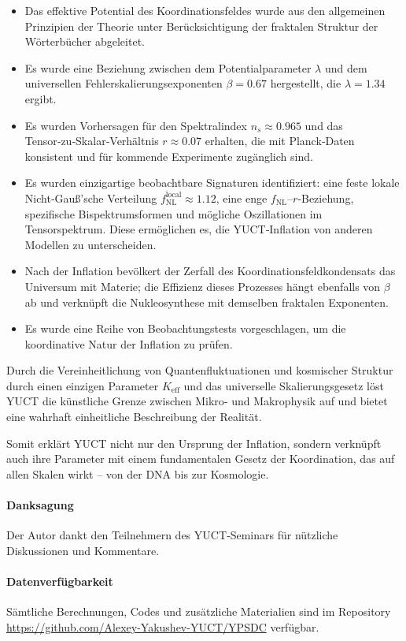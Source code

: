 \documentclass[12pt]{article}
\theoremstyle{remark}
\begin{document}
	\begin{itemize}
		\item Das effektive Potential des Koordinationsfeldes wurde aus den allgemeinen Prinzipien der Theorie unter Berücksichtigung der fraktalen Struktur der Wörterbücher abgeleitet.
		\item Es wurde eine Beziehung zwischen dem Potentialparameter $\lambda$ und dem universellen Fehlerskalierungsexponenten $\beta = 0.67$ hergestellt, die $\lambda = 1.34$ ergibt.
		\item Es wurden Vorhersagen für den Spektralindex $n_s \approx 0.965$ und das Tensor‑zu‑Skalar‑Verhältnis $r \approx 0.07$ erhalten, die mit Planck‑Daten konsistent und für kommende Experimente zugänglich sind.
		\item Es wurden einzigartige beobachtbare Signaturen identifiziert: eine feste lokale Nicht‑Gauß’sche Verteilung $f_{\text{NL}}^{\text{local}} \approx 1.12$, eine enge $f_{\text{NL}}$–$r$‑Beziehung, spezifische Bispektrumsformen und mögliche Oszillationen im Tensorspektrum. Diese ermöglichen es, die YUCT‑Inflation von anderen Modellen zu unterscheiden.
		\item Nach der Inflation bevölkert der Zerfall des Koordinationsfeldkondensats das Universum mit Materie; die Effizienz dieses Prozesses hängt ebenfalls von $\beta$ ab und verknüpft die Nukleosynthese mit demselben fraktalen Exponenten.
		\item Es wurde eine Reihe von Beobachtungstests vorgeschlagen, um die koordinative Natur der Inflation zu prüfen.
	\end{itemize}
	
	Durch die Vereinheitlichung von Quantenfluktuationen und kosmischer Struktur durch einen einzigen Parameter $K_{\mathrm{eff}}$ und das universelle Skalierungsgesetz löst YUCT die künstliche Grenze zwischen Mikro‑ und Makrophysik auf und bietet eine wahrhaft einheitliche Beschreibung der Realität.
	
	Somit erklärt YUCT nicht nur den Ursprung der Inflation, sondern verknüpft auch ihre Parameter mit einem fundamentalen Gesetz der Koordination, das auf allen Skalen wirkt – von der DNA bis zur Kosmologie.
	
	\paragraph*{Danksagung}
	Der Autor dankt den Teilnehmern des YUCT‑Seminars für nützliche Diskussionen und Kommentare.
	
	\paragraph*{Datenverfügbarkeit}
	Sämtliche Berechnungen, Codes und zusätzliche Materialien sind im Repository \url{https://github.com/Alexey-Yakushev-YUCT/YPSDC} verfügbar.
	
\end{document}
